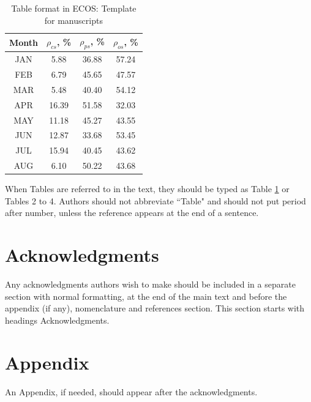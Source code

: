 \documentclass{ECOS_2021}
\begin{document}
\begin{table}[h]
\caption{Table format in ECOS: Template for manuscripts}
\begin{center}
\begin{tabular}{*{4}{c}}
\hline
Month & $\rho_{cs}$, \% & $\rho_{ps}$, \% & $\rho_{os}$, \%\\
\hline
JAN & 5.88 & 36.88 & 57.24 \\
FEB & 6.79 & 45.65 & 47.57 \\
MAR & 5.48 & 40.40 & 54.12 \\
APR & 16.39 & 51.58 & 32.03 \\
MAY & 11.18 & 45.27 & 43.55 \\
JUN & 12.87 & 33.68 & 53.45 \\
JUL & 15.94 & 40.45 & 43.62 \\
AUG & 6.10 & 50.22 & 43.68 \\
\hline
\end{tabular}
\end{center}
\label{Table_1}
\end{table}

When Tables are referred to in the text, they should be typed as Table \ref{Table_1} or Tables 2 to 4. Authors should not abbreviate ``Table" and should not put period after number, unless the reference appears at the end of a sentence.

\sffamily \Large \section*{Acknowledgments}
\rmfamily \normalsize
Any acknowledgments authors wish to make should be included in a separate section with normal formatting, at the end of the main text and before the appendix (if any), nomenclature and references section. This section starts with headings Acknowledgments.

\sffamily \Large \section*{Appendix}
\rmfamily \normalsize
An Appendix, if needed, should appear after the acknowledgments.
\end{document}
